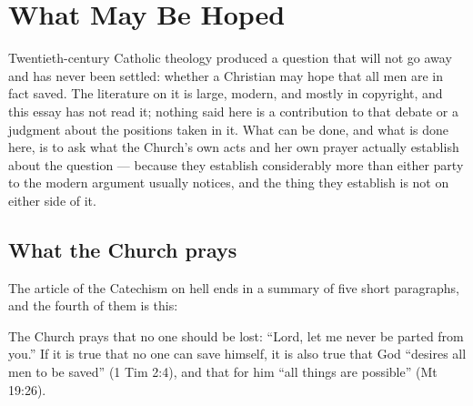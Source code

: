 \section{What May Be Hoped}

Twentieth-century Catholic theology produced a question that will not go away and has never been settled: whether a Christian may hope that all men are in fact saved. The literature on it is large, modern, and mostly in copyright, and this essay has not read it; nothing said here is a contribution to that debate or a judgment about the positions taken in it. What can be done, and what is done here, is to ask what the Church's own acts and her own prayer actually establish about the question --- because they establish considerably more than either party to the modern argument usually notices, and the thing they establish is not on either side of it.

\subsection{What the Church prays}

The article of the Catechism on hell ends in a summary of five short paragraphs, and the fourth of them is this:

\begin{studyframe}
The Church prays that no one should be lost: ``Lord, let me never be parted from you.'' If it is true that no one can save himself, it is also true that God ``desires all men to be saved'' (1 Tim 2:4), and that for him ``all things are possible'' (Mt 19:26).
\end{studyframe}

